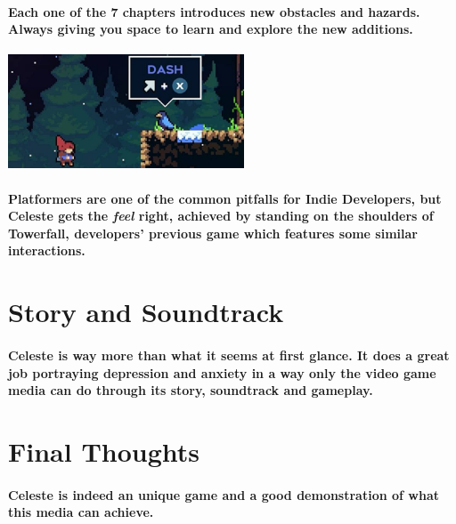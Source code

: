 \documentclass[12pt, twocolumn]{article}
\begin{document}
\paragraph{Each one of the 7 chapters introduces new obstacles and hazards. Always giving you space to learn and explore the new additions.}

\begin{center}
\includegraphics[width=7cm]{imgs/dash.jpeg}
\end{center}

\paragraph{Platformers are one of the common pitfalls for Indie Developers, but Celeste gets the \emph{feel} right, achieved by standing on the shoulders of Towerfall, developers' previous game which features some similar interactions.}

\section*{Story and Soundtrack}

\paragraph{Celeste is way more than what it seems at first glance. It does a great job portraying depression and anxiety in a way only the video game media can do through its story, soundtrack and gameplay.}

\section*{Final Thoughts}

\paragraph{Celeste is indeed an unique game and a good demonstration of what this media can achieve.}
\end{document}
